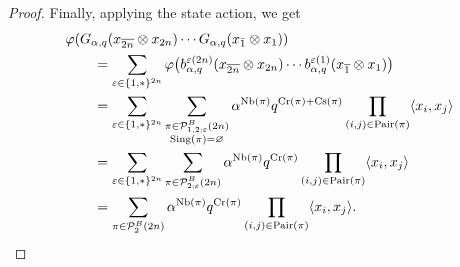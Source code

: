 \documentclass[pdftex]{sigma}
\numberwithin{equation}{section}
\def\B{b_{\s,\q}}
\def\G{G_{\s,\q}}
\def\state {\varphi}
\def\PB{\mathcal{P}^{B}}
\def\Cr{\text{\normalfont Cr}}
\def\InS{\text{\normalfont Cs}}
\def\NB{\text{\normalfont Nb}}
\def\Pair{\text{\normalfont Pair}}
\def\Sing{\text{\normalfont Sing}}
\renewcommand{\epsilon}{\varepsilon}
\newcommand{\e}{{\epsilon}}
\newcommand{\q}{q}
\newcommand{\s}{\alpha}%
\begin{document}
\begin{proof}
 Finally, applying the state action, we get
\begin{align*}
&\state(\G(x_{\overline{ 2n}}\otimes x_{ 2n})\cdots \G(x_{\bar 1}\otimes x_{ 1}))
\\
&\qquad =\sum_{\e\in\{1,\ast\}^{2n}} \state\big( \B^{\epsilon(2n)}(x_{\overline{2n}}\otimes x_{2n})\cdots \B^{\epsilon(1)}(x_{\overline{1}}\otimes x_1)\big)
\\
&\qquad =\sum_{\e\in\{1,\ast\}^{2n}} \sum_{\substack{\pi\in\PB_{1,2;\epsilon}(2n)\\ \Sing(\pi)=\varnothing }} \s^{\NB(\pi)}q^{\Cr(\pi)+ \InS(\pi)}
\prod_{\substack{(i,j) \in \Pair(\pi)} }\langle x_i, x_j\rangle
\\
&\qquad =\sum_{\e\in\{1,\ast\}^{2n}} \sum_{\substack{\pi\in\PB_{2;\epsilon}(2n) }} \s^{\NB(\pi)}q^{\Cr(\pi)}
\prod_{\substack{(i,j) \in \Pair(\pi)} }\langle x_i, x_j\rangle
\\
&\qquad = \sum_{\pi\in\PB_{2}(2n)} \s^{\NB(\pi)}\q^{\Cr(\pi)} \prod_{\substack{(i,j) \in \Pair(\pi)} }\langle x_i, x_j\rangle.
\tag*{\qed}
\end{align*}
\renewcommand{\qed}{}
\end{proof}
\end{document}
